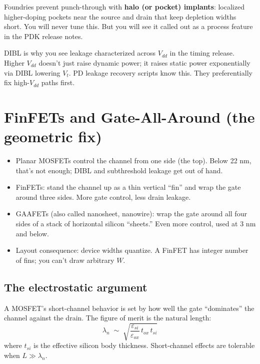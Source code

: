 \documentclass[11pt]{article}
\begin{document}
Foundries prevent punch-through with \textbf{halo (or pocket) implants}: localized higher-doping pockets near the source and drain that keep depletion widths short. You will never tune this. But you will see it called out as a process feature in the PDK release notes.

\begin{pdnote}
DIBL is why you see leakage characterized across $V_{dd}$ in the timing release. Higher $V_{dd}$ doesn't just raise dynamic power; it raises static power exponentially via DIBL lowering $V_t$. PD leakage recovery scripts know this. They preferentially fix high-$V_{dd}$ paths first.
\end{pdnote}

\section{FinFETs and Gate-All-Around (the geometric fix)}

\begin{tldr}
\begin{itemize}[leftmargin=*]
\item Planar MOSFETs control the channel from one side (the top). Below 22 nm, that's not enough; DIBL and subthreshold leakage get out of hand.
\item FinFETs: stand the channel up as a thin vertical ``fin'' and wrap the gate around three sides. More gate control, less drain leakage.
\item GAAFETs (also called nanosheet, nanowire): wrap the gate around all four sides of a stack of horizontal silicon ``sheets.'' Even more control, used at 3 nm and below.
\item Layout consequence: device widths quantize. A FinFET has integer number of fins; you can't draw arbitrary $W$.
\end{itemize}
\end{tldr}

\subsection{The electrostatic argument}

A MOSFET's short-channel behavior is set by how well the gate ``dominates'' the channel against the drain. The figure of merit is the natural length:
\begin{equation}
\lambda_n \;\sim\; \sqrt{\frac{\varepsilon_{si}}{\varepsilon_{ox}}\, t_{ox}\, t_{si}}
\end{equation}
where $t_{si}$ is the effective silicon body thickness. Short-channel effects are tolerable when $L \gg \lambda_n$.
\end{document}
